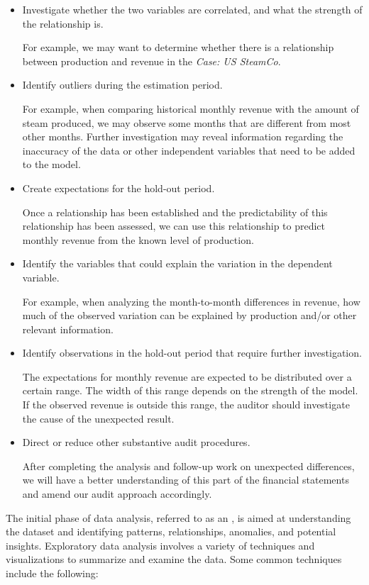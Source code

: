 \begin{itemize}
\item Investigate whether the two variables are correlated, and what the strength of the relationship is.

For example, we may want to determine whether there is a relationship between production and revenue in the \textit{Case: US SteamCo}.

\item Identify outliers during the estimation period.

For example, when comparing historical monthly revenue with the amount of steam produced, we may observe some months that are different from most other months. Further investigation may reveal information regarding the inaccuracy of the data or other independent variables that need to be added to the model. 

\item Create expectations for the hold-out period.

Once a relationship has been established and the predictability of this relationship has been assessed, we can use this relationship to predict monthly revenue from the known level of production.

\item Identify the variables that could explain the variation in the dependent variable.

For example, when analyzing the month-to-month differences in revenue, how much of the observed variation can be explained by production and/or other relevant information.

\item Identify observations in the hold-out period that require further investigation.

The expectations for monthly revenue are expected to be distributed over a certain range. The width of this range depends on the strength of the model. If the observed revenue is outside this range, the auditor should investigate the cause of the unexpected result.

\item Direct or reduce other substantive audit procedures.

After completing the analysis and follow-up work on unexpected differences, we will have a better understanding of this part of the financial statements and amend our audit approach accordingly.
\end{itemize}

\bigskip
The initial phase of data analysis, referred to as an , is aimed at understanding the dataset and identifying patterns, relationships, anomalies, and potential insights. Exploratory data analysis involves a variety of techniques and visualizations to summarize and examine the data. Some common techniques include the following:

